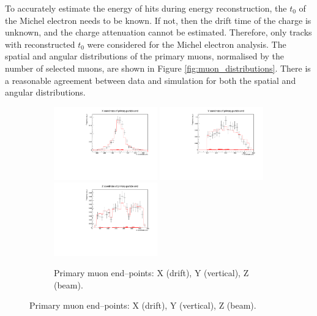 To accurately estimate the energy of hits during energy reconstruction, the
$t_0$ of the Michel electron needs to be known. If not, then the drift time of
the charge is unknown, and the charge attenuation cannot be estimated.
Therefore, only tracks with reconstructed $t_0$ were considered for the Michel
electron analysis. The spatial and angular distributions of the primary muons,
normalised by the number of selected muons, are shown in Figure
\ref{fig:muon_distributions}. There is a reasonable agreement between data and
simulation for both the spatial and angular distributions.
\begin{figure}

	\centering

	\begin{subfigure}[b]{\textwidth}
		\centering
		\includegraphics[width=0.49\textwidth]{figures/DataVMC_primary_EndX.pdf}
		\hfill
		\includegraphics[width=0.49\textwidth]{figures/DataVMC_primary_EndY.pdf}
		\includegraphics[width=0.49\textwidth]{figures/DataVMC_primary_EndZ.pdf}
		\caption {Primary muon end--points: X (drift), Y (vertical), Z (beam).}
		\label{fig:muon_endpoints}
	\end{subfigure}


\end{figure}
